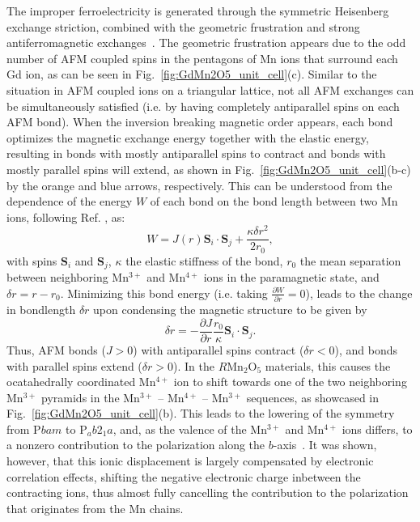 The improper ferroelectricity is generated through the symmetric Heisenberg exchange striction, combined with the geometric frustration and strong antiferromagnetic exchanges~\cite{Choi2008}.
The geometric frustration appears due to the odd number of AFM coupled spins in the pentagons of Mn ions that surround each Gd ion, as can be seen in Fig.~\ref{fig:GdMn2O5_unit_cell}(c).
Similar to the situation in AFM coupled ions on a triangular lattice, not all AFM exchanges can be simultaneously satisfied (i.e. by having completely antiparallel spins on each AFM bond).
When the inversion breaking magnetic order appears, each bond optimizes the magnetic exchange energy together with the elastic energy, resulting in bonds with mostly antiparallel spins to contract and bonds with mostly parallel spins will extend, as shown in Fig.~\ref{fig:GdMn2O5_unit_cell}(b-c) by the orange and blue arrows, respectively. This can be understood from the dependence of the energy $W$ of each bond on the bond length between two Mn ions, following Ref. \cite{Harris1972}, as:
\begin{equation}
	W = J(r)\mathbf{S}_i \cdot \mathbf{S}_j + \frac{\kappa \delta r^2}{2r_0},
\end{equation}
with spins $\mathbf{S}_i$ and $\mathbf{S}_j$, $\kappa$ the elastic stiffness of the bond, $r_0$ the mean separation between neighboring Mn$^{3+}$ and Mn$^{4+}$ ions in the paramagnetic state, and $\delta r = r - r_0$.
Minimizing this bond energy (i.e. taking $\frac{\partial W}{\partial r} = 0$), leads to the change in bondlength $\delta r$ upon condensing the magnetic structure to be given by 
\begin{equation}
	\delta r = -\frac{\partial J}{\partial r}\frac{r_0}{\kappa}\mathbf{S}_i \cdot \mathbf{S}_j. 
\end{equation}
Thus, AFM bonds ($J > 0$) with antiparallel spins contract ($\delta r < 0$), and bonds with parallel spins extend ($\delta r > 0$).
In the $R$Mn$_2$O$_5$ materials, this causes the ocatahedrally coordinated Mn$^{4+}$ ion to shift towards one of the two neighboring Mn$^{3+}$ pyramids in the Mn$^{3+}$ -- Mn$^{4+}$ -- Mn$^{3+}$ sequences, as showcased in Fig.~\ref{fig:GdMn2O5_unit_cell}(b).
This leads to the lowering of the symmetry from P$bam$ to P$_ab2_1a$, and, as the valence of the Mn$^{3+}$ and Mn$^{4+}$ ions differs, to a nonzero contribution to the polarization along the $b$-axis~\cite{Khomskii2009}.
It was shown, however, that this ionic displacement is largely compensated by electronic correlation effects, shifting the negative electronic charge inbetween the contracting ions, thus almost fully cancelling the contribution to the polarization that originates from the Mn chains.
